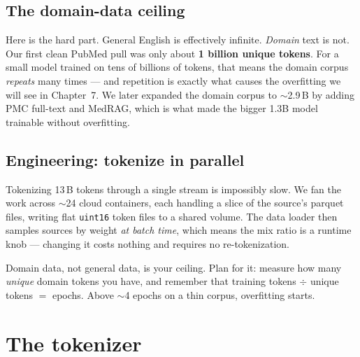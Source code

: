 \section{The domain-data ceiling}

\noindent Here is the hard part. General English is effectively infinite. \emph{Domain} text is not. Our
first clean PubMed pull was only about \textbf{1 billion unique tokens}. For a small model trained on tens of
billions of tokens, that means the domain corpus \emph{repeats} many times --- and repetition is exactly what
causes the overfitting we will see in Chapter~7. We later expanded the domain corpus to $\sim$2.9\,B by adding
PMC full-text and MedRAG, which is what made the bigger 1.3B model trainable without overfitting.

\section{Engineering: tokenize in parallel}
Tokenizing 13\,B tokens through a single stream is impossibly slow. We fan the work across $\sim$24 cloud
containers, each handling a slice of the source's parquet files, writing flat \texttt{uint16} token files to a
shared volume. The data loader then samples sources by weight \emph{at batch time}, which means the mix ratio
is a runtime knob --- changing it costs nothing and requires no re-tokenization.


\begin{lesson}
Domain data, not general data, is your ceiling. Plan for it: measure how many \emph{unique} domain tokens you
have, and remember that training tokens $\div$ unique tokens $=$ epochs. Above $\sim$4 epochs on a thin
corpus, overfitting starts.
\end{lesson}

\chapter{The tokenizer}

